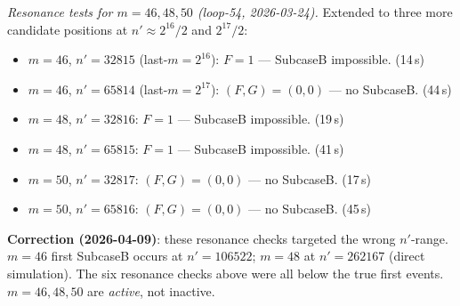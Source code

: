 \documentclass[11pt]{article}
\theoremstyle{plain}
\theoremstyle{definition}
\begin{document}
\emph{Resonance tests for $m=46,48,50$ (loop-54, 2026-03-24).}
Extended to three more candidate positions at $n' \approx 2^{16}/2$ and $2^{17}/2$:
\begin{itemize}
  \item $m=46$, $n'=32815$ (last-$m=2^{16}$): $F=1$ — SubcaseB impossible. (14\,s)
  \item $m=46$, $n'=65814$ (last-$m=2^{17}$): $(F,G)=(0,0)$ — no SubcaseB. (44\,s)
  \item $m=48$, $n'=32816$: $F=1$ — SubcaseB impossible. (19\,s)
  \item $m=48$, $n'=65815$: $F=1$ — SubcaseB impossible. (41\,s)
  \item $m=50$, $n'=32817$: $(F,G)=(0,0)$ — no SubcaseB. (17\,s)
  \item $m=50$, $n'=65816$: $(F,G)=(0,0)$ — no SubcaseB. (45\,s)
\end{itemize}
\textbf{Correction (2026-04-09)}: these resonance checks targeted the wrong $n'$-range.
$m=46$ first SubcaseB occurs at $n'=106522$; $m=48$ at $n'=262167$ (direct simulation).
The six resonance checks above were all below the true first events.
$m=46,48,50$ are \emph{active}, not inactive.
\end{document}

